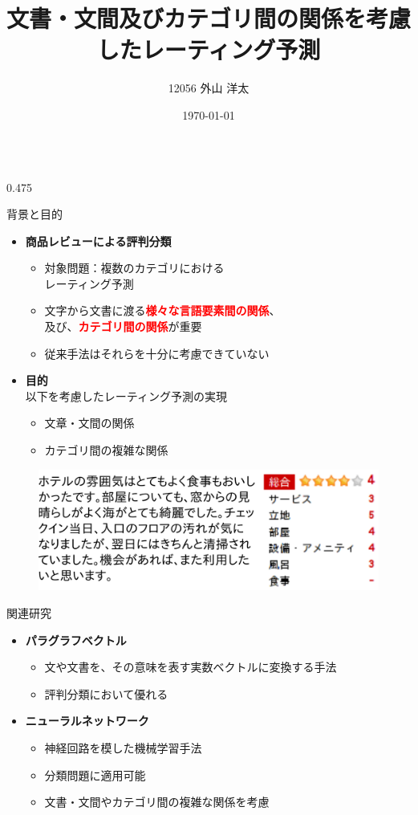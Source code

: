 \documentclass[unicode,10pt]{beamer}
\title{文書・文間及びカテゴリ間の関係を考慮したレーティング予測}
\institute{知能数理研究室}
\author{12056 外山 洋太}
\date{\today}
\newcommand{\itemtitle}[1]{\textbf{#1}\\}
\newcommand{\fire}[1]{\textcolor{red}{\textbf{#1}}}
\newcommand{\columnsize}{0.475\textwidth}
\begin{document}
\begin{frame}
\begin{columns}[onlytextwidth,t]

\begin{column}{\columnsize}
  \begin{block}{背景と目的}
    \begin{itemize}
      \item \itemtitle{商品レビューによる評判分類}
        \begin{itemize}
          \item 対象問題：複数のカテゴリにおける\\レーティング予測
          \item 文字から文書に渡る\fire{様々な言語要素間の関係}、\\
                及び、\fire{カテゴリ間の関係}が重要
          \item 従来手法はそれらを十分に考慮できていない
        \end{itemize}
      \item \itemtitle{目的}
        以下を考慮したレーティング予測の実現
        \begin{itemize}
          \item 文章・文間の関係
          \item カテゴリ間の複雑な関係
        \end{itemize}
    \end{itemize}
    \begin{figure}
      \includegraphics[width=0.9\linewidth]{fig/review.png}
    \end{figure}
  \end{block}

  \begin{block}{関連研究}
    \begin{itemize}
      \item \itemtitle{パラグラフベクトル}
        \begin{itemize}
          \item 文や文書を、その意味を表す実数ベクトルに変換する手法
          \item 評判分類において優れる
        \end{itemize}
      \item \itemtitle{ニューラルネットワーク}
        \begin{itemize}
          \item 神経回路を模した機械学習手法
          \item 分類問題に適用可能
          \item 文書・文間やカテゴリ間の複雑な関係を考慮
        \end{itemize}
    \end{itemize}
  \end{block}


\end{column}
\end{columns}
\end{frame}
\end{document}
